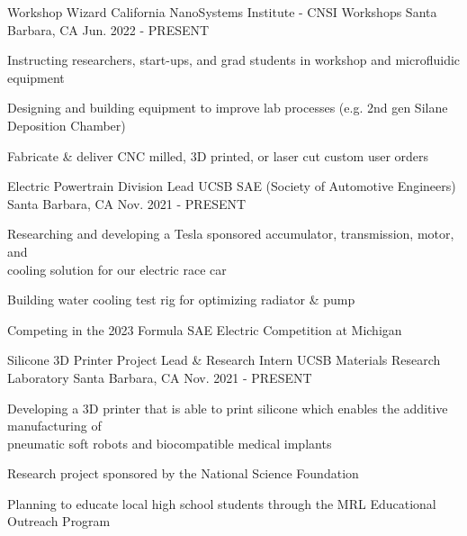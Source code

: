 

\begin{cventries}

\cventry
{Workshop Wizard} %
{California NanoSystems Institute - CNSI Workshops} %
{Santa Barbara, CA} %
{Jun. 2022 - PRESENT} %
{ %
\begin{cvitems}
\item {Instructing researchers, start-ups, and grad students in workshop and microfluidic equipment}
\item {Designing and building equipment to improve lab processes (e.g. 2nd gen Silane Deposition Chamber)}
\item {Fabricate \& deliver CNC milled, 3D printed, or laser cut custom user orders }
\end{cvitems}
}


\cventry
{Electric Powertrain Division Lead} %
{UCSB SAE (Society of Automotive Engineers)} %
{Santa Barbara, CA} %
{Nov. 2021 - PRESENT} %
{ %
\begin{cvitems}   
\item {Researching and developing a Tesla sponsored accumulator, transmission, motor, and \\ cooling solution for our electric race car}
\item {Building water cooling test rig for optimizing radiator \& pump}
\item {Competing in the 2023 Formula SAE Electric Competition at Michigan}
\end{cvitems}
}



\cventry
{Silicone 3D Printer Project Lead \& Research Intern} %
{UCSB Materials Research Laboratory} %
{Santa Barbara, CA} %
{Nov. 2021 - PRESENT} %
{ %
\begin{cvitems}
\item {Developing a 3D printer that is able to print silicone which enables the additive manufacturing of \\ pneumatic soft robots and biocompatible medical implants}
\item {Research project sponsored by the National Science Foundation}
\item {Planning to educate local high school students through the MRL Educational Outreach Program}
\end{cvitems}
}


\end{cventries}
